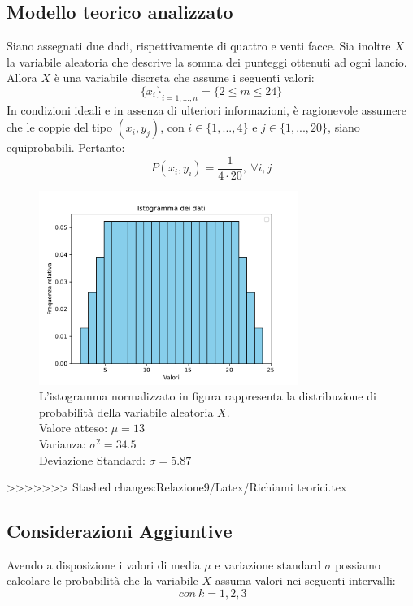 \subsection{Modello teorico analizzato}
Siano assegnati due dadi, rispettivamente di quattro e venti facce. Sia inoltre $X$ la variabile aleatoria che descrive la somma dei punteggi ottenuti ad ogni lancio. Allora $X$ è una variabile discreta che assume i seguenti valori:
\begin{equation}
	\{x_i\}_{i=1,...,n} = \{2 \leq m \leq 24\}
\end{equation}
In condizioni ideali e in assenza di ulteriori informazioni, è ragionevole assumere che le coppie del tipo $(x_i, y_j)$, con $i \in \{1,...,4\}$ e $j \in \{1,...,20\}$, siano equiprobabili. Pertanto:
\begin{equation}
	P(x_i, y_i) = \frac{1}{4 \cdot 20},\ \forall i, j
\end{equation}
\begin{figure}[H]
	\centering
	\includegraphics[width=0.75\textwidth]{istogramma1.pdf}
	\caption{L'istogramma normalizzato in figura rappresenta la distribuzione di probabilità della variabile aleatoria $X$. \\
	Valore atteso: $\mu=13$ \\
	Varianza: $\sigma^2=34.5$ \\
	Deviazione Standard: $\sigma=5.87$}
\end{figure}
>>>>>>> Stashed changes:Relazione9/Latex/Richiami teorici.tex

\subsection{Considerazioni Aggiuntive}
Avendo a disposizione i valori di media $\mu$ e variazione standard $\sigma$ possiamo calcolare le probabilità che la variabile $X$ assuma valori nei seguenti intervalli:
\begin{equation*}
	[\mu-k\sigma, \mu+k\sigma]\ con\ k=1,2,3
\end{equation*} 

